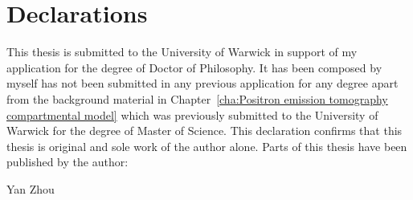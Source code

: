 \chapter*{Declarations}

This thesis is submitted to the University of Warwick in support of my
application for the degree of Doctor of Philosophy. It has been composed by
myself has not been submitted in any previous application for any degree apart
from the background material in Chapter~\ref{cha:Positron emission tomography
  compartmental model} which was previously submitted to the University of
Warwick for the degree of Master of Science. This declaration confirms that
this thesis is original and sole work of the author alone. Parts of this
thesis have been published by the author:





\baselineskip
\noindent Yan Zhou
